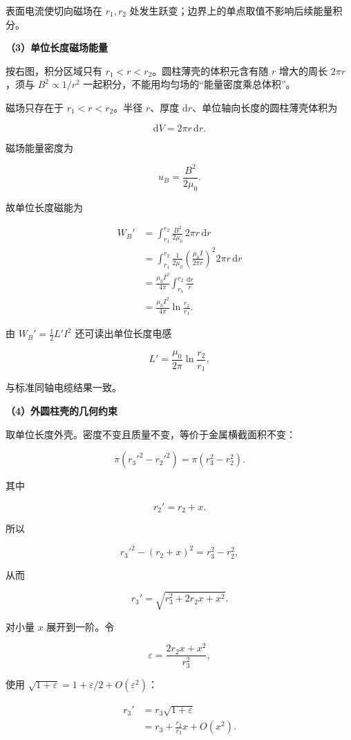 \documentclass[12pt,a4paper,UTF8]{ctexart}
\begin{document}
表面电流使切向磁场在 \(r_1,r_2\)
处发生跃变；边界上的单点取值不影响后续能量积分。

\textbf{（3）单位长度磁场能量}

按右图，积分区域只有 \(r_1<r<r_2\)。圆柱薄壳的体积元含有随 \(r\)
增大的周长 \(2\pi r\)，须与 \(B^2\propto1/r^2\)
一起积分，不能用均匀场的``能量密度乘总体积''。

磁场只存在于 \(r_1<r<r_2\)。半径 \(r\)、厚度
\(\mathrm dr\)、单位轴向长度的圆柱薄壳体积为

\[\mathrm dV=2\pi r\,\mathrm dr.\]

磁场能量密度为

\[u_B=\frac{B^2}{2\mu_0}.\]

故单位长度磁能为

\[\begin{aligned}
W_B'
&=\int_{r_1}^{r_2}\frac{B^2}{2\mu_0}\,2\pi r\,\mathrm dr\\
&=\int_{r_1}^{r_2}
\frac1{2\mu_0}\left(\frac{\mu_0I}{2\pi r}\right)^2
2\pi r\,\mathrm dr\\
&=\frac{\mu_0I^2}{4\pi}
\int_{r_1}^{r_2}\frac{\mathrm dr}{r}\\
&=\boxed{\frac{\mu_0I^2}{4\pi}
\ln\frac{r_2}{r_1}}.
\end{aligned} \tag{42}\]

由 \(W_B'=\frac12L'I^2\) 还可读出单位长度电感

\[L'=\frac{\mu_0}{2\pi}\ln\frac{r_2}{r_1},\]

与标准同轴电缆结果一致。

\textbf{（4）外圆柱壳的几何约束}

取单位长度外壳。密度不变且质量不变，等价于金属横截面积不变：

\[\pi(r_3'^2-r_2'^2)=\pi(r_3^2-r_2^2).\]

其中

\[r_2'=r_2+x.\]

所以

\[r_3'^2-(r_2+x)^2=r_3^2-r_2^2,\]

从而

\[r_3'=\sqrt{r_3^2+2r_2x+x^2}. \tag{43}\]

对小量 \(x\) 展开到一阶。令

\[\varepsilon=\frac{2r_2x+x^2}{r_3^2},\]

使用 \(\sqrt{1+\varepsilon}=1+\varepsilon/2+O(\varepsilon^2)\)：

\[\begin{aligned}
r_3'
&=r_3\sqrt{1+\varepsilon}\\
&=r_3+\frac{r_2}{r_3}x+O(x^2).
\end{aligned}\]
\end{document}
